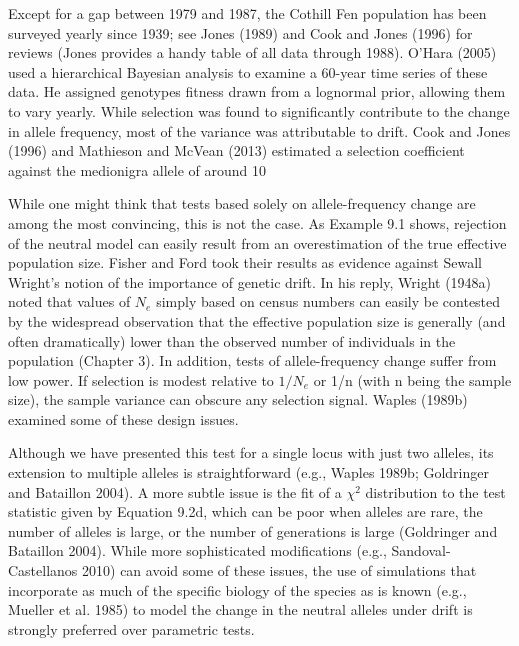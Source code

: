 \documentclass{article}
\begin{document}
Except for a gap between 1979 and 1987, the Cothill Fen population has been surveyed yearly since 1939; see Jones (1989) and Cook and Jones (1996) for reviews (Jones provides a handy table of all data through 1988). O'Hara (2005) used a hierarchical Bayesian analysis to examine a 60-year time series of these data. He assigned genotypes fitness drawn from a lognormal prior, allowing them to vary yearly. While selection was found to significantly contribute to the change in allele frequency, most of the variance was attributable to drift. Cook and Jones (1996) and Mathieson and McVean (2013) estimated a selection coefficient against the medionigra allele of around 10%

While one might think that tests based solely on allele-frequency change are among the most convincing, this is not the case. As Example 9.1 shows, rejection of the neutral model can easily result from an overestimation of the true effective population size. Fisher and Ford took their results as evidence against Sewall Wright's notion of the importance of genetic drift. In his reply, Wright (1948a) noted that values of  $ N_e $ simply based on census numbers can easily be contested by the widespread observation that the effective population size is generally (and often dramatically) lower than the observed number of individuals in the population (Chapter 3). In addition, tests of allele-frequency change suffer from low power. If selection is modest relative to  $ 1/N_e $ or 1/n (with n being the sample size), the sample variance can obscure any selection signal. Waples (1989b) examined some of these design issues.

Although we have presented this test for a single locus with just two alleles, its extension to multiple alleles is straightforward (e.g., Waples 1989b; Goldringer and Bataillon 2004). A more subtle issue is the fit of a  $ \chi^{2} $ distribution to the test statistic given by Equation 9.2d, which can be poor when alleles are rare, the number of alleles is large, or the number of generations is large (Goldringer and Bataillon 2004). While more sophisticated modifications (e.g., Sandoval-Castellanos 2010) can avoid some of these issues, the use of simulations that incorporate as much of the specific biology of the species as is known (e.g., Mueller et al. 1985) to model the change in the neutral alleles under drift is strongly preferred over parametric tests.
\end{document}
